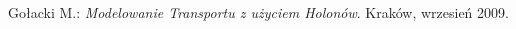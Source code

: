 \begin{thebibliography}{2}
  Gołacki M.:
  \emph{Modelowanie Transportu z użyciem Holonów}. Kraków, wrzesień 2009.
  
\end{thebibliography}

